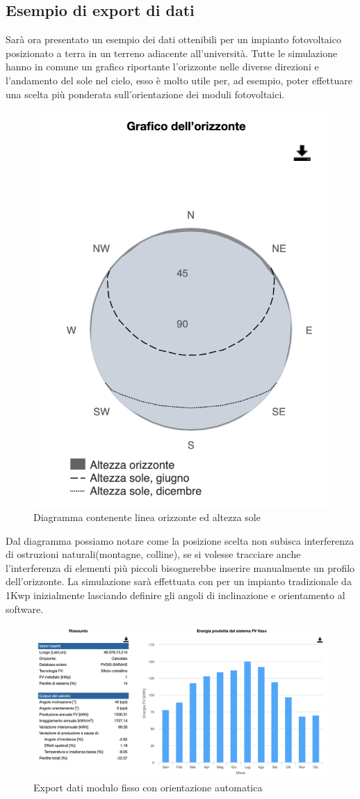 \subsection{Esempio di export di dati}
Sarà ora presentato un esempio dei dati ottenibili per un impianto fotovoltaico posizionato a terra in un terreno adiacente all'università.
Tutte le simulazione hanno in comune un grafico riportante l'orizzonte nelle diverse direzioni e l'andamento del sole nel cielo, esso è molto utile per, ad esempio, poter effettuare una scelta più ponderata sull'orientazione dei moduli fotovoltaici.
\begin{figure}[H]
    \centering
    \includegraphics[height=0.5\textwidth]{res/cap 4/orizzonte}
    \caption{Diagramma contenente linea orizzonte ed altezza sole}
    \label{fig:orizzonte}
\end{figure}\noindent
Dal diagramma possiamo notare come la posizione scelta non subisca interferenza di ostruzioni naturali(montagne, colline), se si volesse tracciare anche l'interferenza di elementi più piccoli bisognerebbe inserire manualmente un profilo dell'orizzonte.
La simulazione sarà effettuata con per un impianto tradizionale da 1Kwp inizialmente lasciando definire gli angoli di inclinazione e orientamento al software.
\vfill
\newpage
\begin{figure}[H]
    \centering
    \includegraphics[height=0.5\textwidth]{res/cap 4/fissi uniud-auto}
    \caption{Export dati modulo fisso con orientazione automatica}
    \label{fig:export}
\end{figure}\noindent
